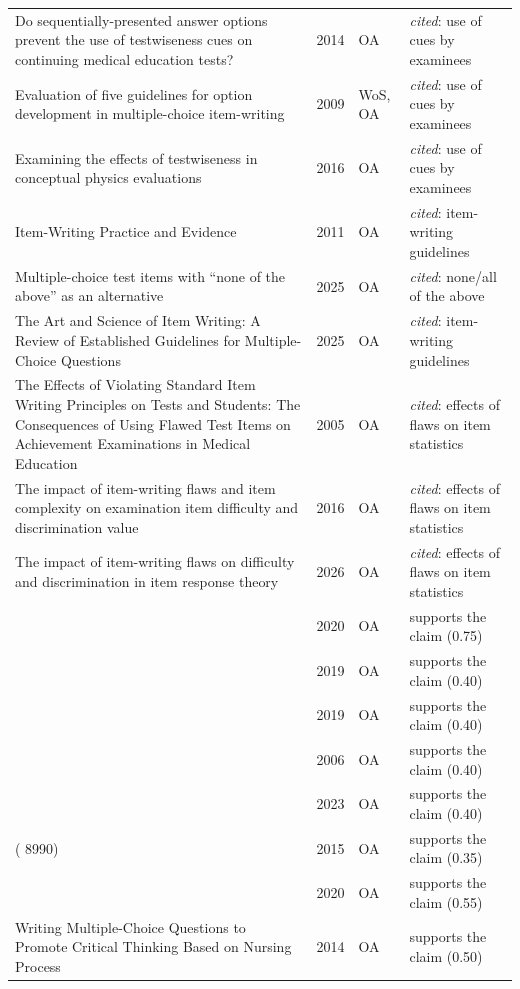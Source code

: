 \begin{longtable}{@{}%
  >{\raggedright\arraybackslash}p{}c%
  >{\raggedright\arraybackslash}p{}%
  >{\raggedright\arraybackslash}p{}@{}}
Do sequentially-presented answer options prevent the use of testwiseness cues on continuing medical education tests? & 2014 & OA & \emph{cited}: use of cues by examinees \\
Evaluation of five guidelines for option development in multiple-choice item-writing & 2009 & WoS, OA & \emph{cited}: use of cues by examinees \\
Examining the effects of testwiseness in conceptual physics evaluations & 2016 & OA & \emph{cited}: use of cues by examinees \\
Item-Writing Practice and Evidence & 2011 & OA & \emph{cited}: item-writing guidelines \\
Multiple-choice test items with ``none of the above'' as an alternative & 2025 & OA & \emph{cited}: none/all of the above \\
The Art and Science of Item Writing: A Review of Established Guidelines for Multiple-Choice Questions & 2025 & OA & \emph{cited}: item-writing guidelines \\
The Effects of Violating Standard Item Writing Principles on Tests and Students: The Consequences of Using Flawed Test Items on Achievement Examinations in Medical Education & 2005 & OA & \emph{cited}: effects of flaws on item statistics \\
The impact of item-writing flaws and item complexity on examination item difficulty and discrimination value & 2016 & OA & \emph{cited}: effects of flaws on item statistics \\
The impact of item-writing flaws on difficulty and discrimination in item response theory & 2026 & OA & \emph{cited}: effects of flaws on item statistics \\
           & 2020 & OA & supports the claim (0.75) \\
              & 2019 & OA & supports the claim (0.40) \\
               & 2019 & OA & supports the claim (0.40) \\
                  & 2006 & OA & supports the claim (0.40) \\
                        & 2023 & OA & supports the claim (0.40) \\
                         ( 8990) & 2015 & OA & supports the claim (0.35) \\
  \textquotedbl{}  \textquotedbl{}          & 2020 & OA & supports the claim (0.55) \\
  Writing Multiple-Choice Questions to Promote Critical Thinking Based on Nursing Process & 2014 & OA & supports the claim (0.50) \\

\end{longtable}
